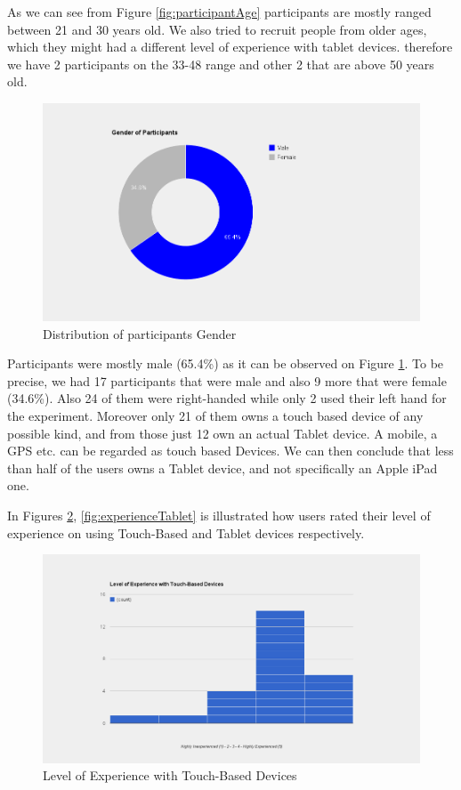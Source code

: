 As we can see from Figure \ref{fig:participantAge} participants are mostly ranged between 21 and 30 years old. We also tried to recruit people from older ages, which they might had a different level of experience with tablet devices. therefore we have 2 participants on the 33-48 range and other 2 that are above 50 years old.

\begin{figure}[H]
\centering
\includegraphics[scale=0.3]{figures/participantGender.png}
\caption{Distribution of participants Gender}
\label{fig:participantGender}
\end{figure}

Participants were mostly male (65.4\%) as it can be observed on Figure \ref{fig:participantGender}. To be precise, we had 17 participants that were male and also 9 more that were female (34.6\%). Also 24 of them were right-handed while only 2 used their left hand for the experiment. Moreover only 21 of them owns a touch based device of any possible kind, and from those just 12 own an actual Tablet device. A mobile, a GPS etc. can be regarded as touch based Devices. We can then conclude that less than half of the users owns a Tablet device, and not specifically an Apple iPad one.

In Figures \ref{fig:experienceTouch}, \ref{fig:experienceTablet} is illustrated how users rated their level of experience on using Touch-Based and Tablet devices respectively.

\begin{figure}[H]
\centering
\includegraphics[scale=0.3]{figures/experienceTouch.png}
\caption{Level of Experience with Touch-Based Devices}
\label{fig:experienceTouch}
\end{figure}


